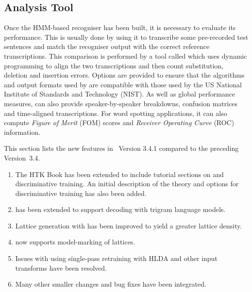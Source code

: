 \subsection{Analysis Tool}

Once the HMM-based recogniser has been built, it is necessary
to evaluate its performance.  This is usually done by using it
to transcribe some pre-recorded test sentences and match the
recogniser output with the correct reference transcriptions.
This comparison is performed by a tool called 
 which uses dynamic programming to align the two transcriptions
and then count substitution, deletion and insertion errors.
Options are provided to ensure that the
algorithms and output formats used 
by  are compatible
with those used by the US National Institute of Standards and Technology
(NIST).
As well as global performance measures,
 can also provide speaker-by-speaker breakdowns,
confusion matrices and time-aligned transcriptions.  For word spotting
applications, it can also compute \textit{Figure of Merit} (FOM) scores
and \textit{Receiver Operating Curve} (ROC) information.



This  section lists the new
features in \HTK\ Version 3.4.1 compared to the preceding Version~3.4.

\begin{enumerate}
\item The HTK Book has been extended to include tutorial sections on
   and discriminative training. An initial description of the
  theory and options for discriminative training has also been added.

\item {} has been extended to support decoding with trigram
  language models.

\item Lattice generation with  has been improved to yield a
  greater lattice density.

\item {} now supports model-marking of lattices.

\item Issues with  using single-pass retraining with HLDA and
  other input transforms have been resolved.

\item Many other smaller changes and bug fixes have been integrated.
\end{enumerate}


